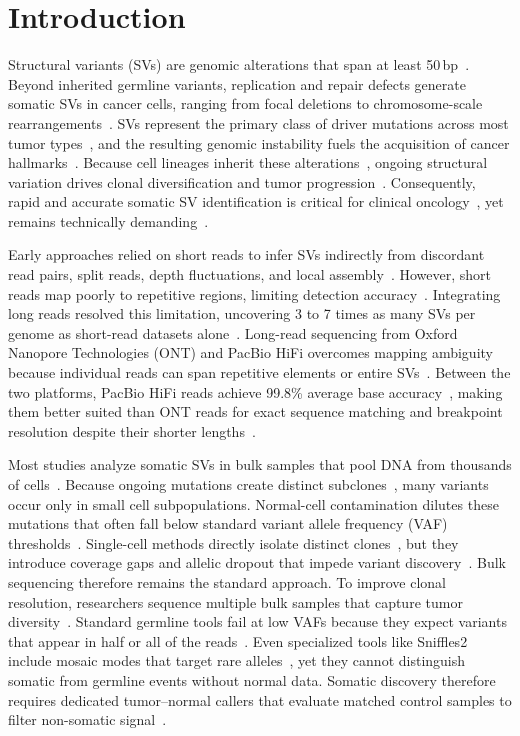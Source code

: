 \section{Introduction}\label{sec:introduction}

Structural variants (SVs) are genomic alterations that span at least 50\,bp~\cite{chaisson}. 
Beyond inherited germline variants, replication and repair defects generate somatic SVs in cancer cells, ranging from focal deletions to chromosome-scale rearrangements~\cite{cosenza,chromothripsis}. 
SVs represent the primary class of driver mutations across most tumor types~\cite{cosenza}, and the resulting genomic instability fuels the acquisition of cancer hallmarks~\cite{hanahan2011,hanahan2022}. 
Because cell lineages inherit these alterations~\cite{mcgranahan}, ongoing structural variation drives clonal diversification and tumor progression~\cite{ith}. 
Consequently, rapid and accurate somatic SV identification is critical for clinical oncology~\cite{schram2017,severus}, yet remains technically demanding~\cite{nanomonsv}.

Early approaches relied on short reads to infer SVs indirectly from discordant read pairs, split reads, depth fluctuations, and local assembly~\cite{manta,svaba,gripss}. 
However, short reads map poorly to repetitive regions, limiting detection accuracy~\cite{chaisson}. 
Integrating long reads resolved this limitation, uncovering 3 to 7 times as many SVs per genome as short-read datasets alone~\cite{chaisson}. 
Long-read sequencing from Oxford Nanopore Technologies (ONT) and PacBio HiFi overcomes mapping ambiguity because individual reads can span repetitive elements or entire SVs~\cite{sedlazeck,logsdon,Ahsan_2023}. 
Between the two platforms, PacBio HiFi reads achieve 99.8\% average base accuracy~\cite{wenger}, making them better suited than ONT reads for exact sequence matching and breakpoint resolution despite their shorter lengths~\cite{logsdon,Delahaye_2021}.

Most studies analyze somatic SVs in bulk samples that pool DNA from thousands of cells~\cite{pcawg}. 
Because ongoing mutations create distinct subclones~\cite{ith}, many variants occur only in small cell subpopulations. 
Normal-cell contamination dilutes these mutations that often fall below standard variant allele frequency (VAF) thresholds~\cite{severus,ith}. 
Single-cell methods directly isolate distinct clones~\cite{navin}, but they introduce coverage gaps and allelic dropout that impede variant discovery~\cite{gawad}. 
Bulk sequencing therefore remains the standard approach. 
To improve clonal resolution, researchers sequence multiple bulk samples that capture tumor diversity~\cite{mcgranahan,gerlinger}. 
Standard germline tools fail at low VAFs because they expect variants that appear in half or all of the reads~\cite{severus}. 
Even specialized tools like Sniffles2 include mosaic modes that target rare alleles~\cite{sniffles2}, yet they cannot distinguish somatic from germline events without normal data. 
Somatic discovery therefore requires dedicated tumor--normal callers that evaluate matched control samples to filter non-somatic signal~\cite{severus,savana,nanomonsv}.


